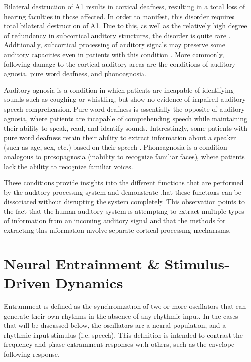 \documentclass[titlepage]{article}
\begin{document}
    Bilateral destruction of A1 results in cortical deafness, resulting in a
    total loss of hearing faculties in those affected. In order to manifest,
    this disorder requires total bilateral destruction of A1. Due to this, as
    well as the relatively high degree of redundancy in subcortical auditory
    structures, the disorder is quite rare \cite{Polster1998}. Additionally,
    subcortical processing of auditory signals may preserve some auditory
    capacities even in patients with this condition \cite{Cavinato2012}. More
    commonly, following damage to the cortical auditory areas are the conditions
    of auditory agnosia, pure word deafness, and phonoagnosia.

    Auditory agnosia
    is a condition in which patients are incapable of identifying sounds such
    as coughing or whistling, but show no evidence of impaired auditory speech
    comprehension. Pure word deafness is essentially the opposite of auditory
    agnosia, where patients are incapable of comprehending speech while
    maintaining their ability to speak, read, and identify sounds.
    Interestingly, some patients with pure word deafness retain their ability
    to extract information about a speaker (such as age, sex, etc.) based on
    their speech \cite{Polster1998}. Phonoagnosia is a condition analogous to
    prosopagnosia (inability to recognize familiar faces), where patients
    lack the ability to recognize familiar voices.


    These conditions provide insights into the different functions that are
    performed by the auditory processing system and demonstrate that these
    functions can be dissociated without disrupting the system completely. This
    observation points to the fact that the human auditory system is attempting
    to extract multiple types of information from an incoming auditory signal
    and that the methods for extracting this information involve separate
    cortical processing mechanisms.


\section{Neural Entrainment \& Stimulus-Driven Dynamics} \label{entrainment}

  Entrainment is defined as the synchronization of two or more oscillators 
  that can generate their own rhythms in the absence of any rhythmic input. In
  the cases that will be discussed below, the oscillators are a neural 
  population, and a rhythmic input stimulus (i.e. speech). This definition is 
  intended to contrast the frequency and phase entrainment responses with 
  others, such as the envelope-following response.
\end{document}
